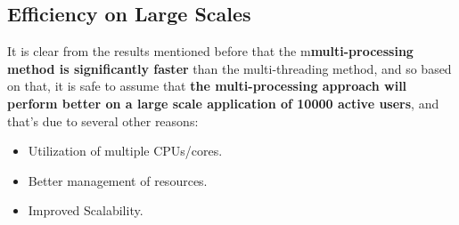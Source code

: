 \documentclass[pdftex,12pt,a4paper]{article}
\begin{document}
\subsection{Efficiency on Large Scales}
It is clear from the results mentioned before that the m\textbf{multi-processing method is significantly faster} than the multi-threading method, and so based on that, it is safe to assume that \textbf{the multi-processing approach will perform better on a large scale application of 10000 active users}, and that's due to several other reasons:
\begin{itemize}
\item Utilization of multiple CPUs/cores.
\item Better management of resources.
\item Improved Scalability.
\end{itemize}
\end{document}
